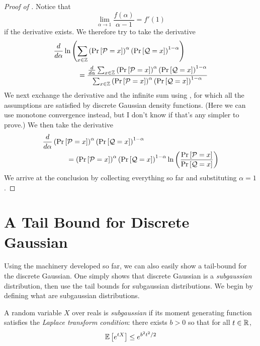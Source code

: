 \documentclass{article}
\begin{document}
\begin{proof}[Proof of ]
	Notice that
	\begin{equation}
		\lim_{\alpha\rightarrow 1}\frac{f(\alpha)}{\alpha-1}=f'(1)
	\end{equation}
	if the derivative exists.
	We therefore try to take the derivative
	\begin{align*}
		\frac{d}{d\alpha}
		&\ln\left(\sum_{x\in\mathbb{Z}}
		\left(\Pr\left[\mathcal{P}=x\right]\right)^\alpha
		\left(\Pr\left[\mathcal{Q}=x\right]\right)^{1-\alpha}\right) \\
		&\qquad=
		\frac{
			\frac{d}{d\alpha}
			\sum_{x\in\mathbb{Z}}
			\left(\Pr\left[\mathcal{P}=x\right]\right)^\alpha
			\left(\Pr\left[\mathcal{Q}=x\right]\right)^{1-\alpha}
		}{
			\sum_{x\in\mathbb{Z}}
			\left(\Pr\left[\mathcal{P}=x\right]\right)^\alpha
			\left(\Pr\left[\mathcal{Q}=x\right]\right)^{1-\alpha}
		}
	\end{align*}
	We next exchange the derivative and the infinite sum using ,
	for which all the assumptions are satisfied by discrete Gaussian density functions.
	(Here we can use monotone convergence instead, but I don't know if that's any simpler to prove.)
	We then take the derivative
	\begin{align*}
		\frac{d}{d\alpha}&
		\left(\Pr\left[\mathcal{P}=x\right]\right)^\alpha
		\left(\Pr\left[\mathcal{Q}=x\right]\right)^{1-\alpha} \\
		&\qquad=\left(\Pr\left[\mathcal{P}=x\right]\right)^\alpha
		\left(\Pr\left[\mathcal{Q}=x\right]\right)^{1-\alpha}
		\ln\left(\frac{\Pr\left[\mathcal{P}=x\right]}{\Pr\left[\mathcal{Q}=x\right]}\right)
	\end{align*}
	We arrive at the conclusion by collecting everything so far and substituting $\alpha=1$.
\end{proof}

\section{A Tail Bound for Discrete Gaussian}

Using the machinery developed so far,
we can also easily show a tail-bound for the discrete Gaussian.
One simply shows that discrete Gaussian is a \emph{subgaussian} distribution,
then use the tail bounds for subgaussian distributions.
We begin by defining what are subgaussian distributions.
\begin{definition}
	A random variable $X$ over reals is \emph{subgaussian} if its moment generating function satisfies the \emph{Laplace transform condition}:
	there exists $b>0$ so that for all $t\in\mathbb{R}$,
	\begin{equation}
		\operatorname*{\mathbb{E}}\left[e^{tX}\right] \leq e^{b^2t^2/2}
	\end{equation}
\end{definition}
\end{document}
